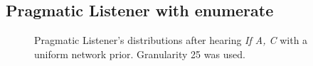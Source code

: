 \documentclass[10pt,a4paper]{article}
\begin{document}
\subsection*{Pragmatic Listener with enumerate}
\begin{figure}[ht]
\centering
\subfloat[$P(C)$]{\label{fig:PL-PAgivenC}}\qquad
\subfloat[$P(C|A)$]{\label{fig:PL-PCgivenA}}\qquad
\subfloat[$P(A|C)$]{\label{fig:PL-PC}}\qquad
{}\qquad


\caption{Pragmatic Listener's distributions after hearing \textit{If A, C} with a uniform network prior. Granularity 25 was used.}
\label{fig:PL}
\end{figure}


\FloatBarrier
\end{document}
